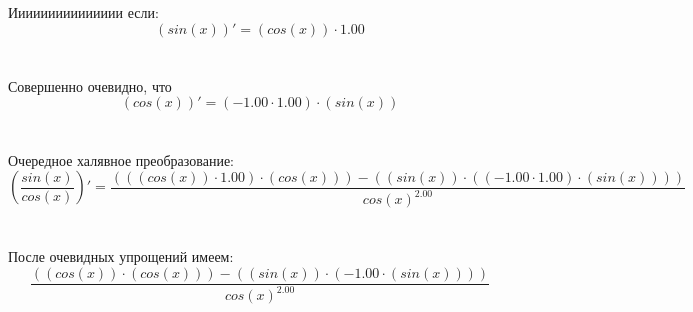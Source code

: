\documentclass{article}
\begin{document}
Иииииииииииииии если:\n\n
$$(sin(x))' = (cos(x)) \cdot 1.00$$\\\\
Совершенно очевидно, что\n\n
$$(cos(x))' = (-1.00 \cdot 1.00) \cdot (sin(x))$$\\\\
Очередное халявное преобразование:\n\n
$$(\frac{sin(x)}{cos(x)})' = \frac{(((cos(x)) \cdot 1.00) \cdot (cos(x))) - ((sin(x)) \cdot ((-1.00 \cdot 1.00) \cdot (sin(x))))}{{cos(x)}^{2.00}}$$\\\\
После очевидных упрощений имеем:
$$\frac{((cos(x)) \cdot (cos(x))) - ((sin(x)) \cdot (-1.00 \cdot (sin(x))))}{{cos(x)}^{2.00}}$$\\\\
\end{document}
